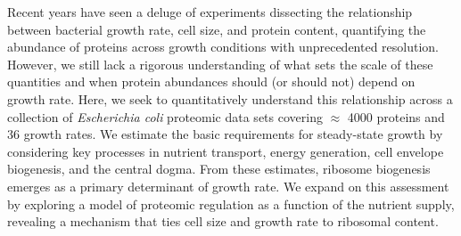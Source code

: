 Recent years have seen a deluge of experiments dissecting the relationship
between bacterial growth rate, cell size, and protein content, quantifying
the abundance of proteins across growth conditions with unprecedented
resolution. However, we still lack a rigorous understanding of what sets the
scale of these quantities and when protein abundances should (or should not)
depend on growth rate. Here, we seek to quantitatively understand this
relationship across a collection of \textit{Escherichia coli} proteomic data
sets covering $\approx$ 4000 proteins and 36 growth rates. We estimate
the basic requirements for steady-state growth by considering key processes
in nutrient transport, energy generation, cell envelope biogenesis, and the
central dogma. From these estimates, ribosome biogenesis emerges as a primary
determinant of growth rate. We expand on this assessment by exploring a model of proteomic
regulation as a function of the nutrient supply, revealing a mechanism that
ties cell size and growth rate to ribosomal content.
